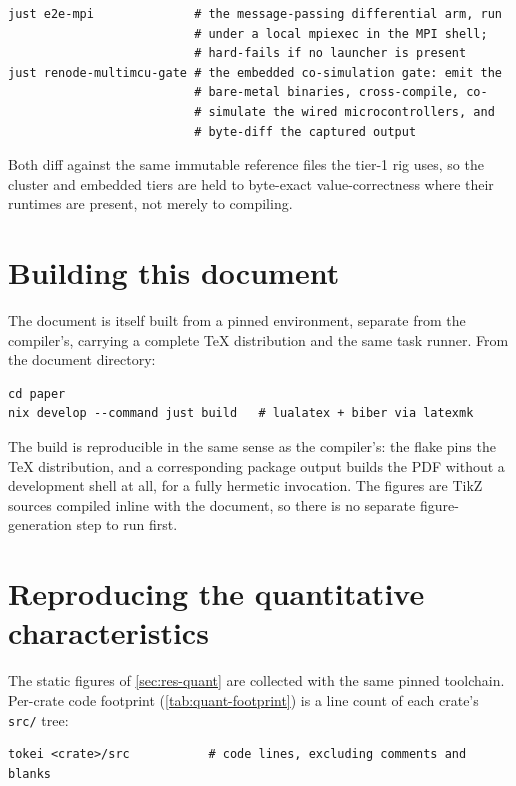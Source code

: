 \begin{verbatim}
just e2e-mpi              # the message-passing differential arm, run
                          # under a local mpiexec in the MPI shell;
                          # hard-fails if no launcher is present
just renode-multimcu-gate # the embedded co-simulation gate: emit the
                          # bare-metal binaries, cross-compile, co-
                          # simulate the wired microcontrollers, and
                          # byte-diff the captured output
\end{verbatim}

Both diff against the same immutable reference files the tier-1 rig uses, so the
cluster and embedded tiers are held to byte-exact value-correctness where their
runtimes are present, not merely to compiling.

\section{Building this document}

The document is itself built from a pinned environment, separate from the
compiler's, carrying a complete \TeX{} distribution and the same task runner. From
the document directory:

\begin{verbatim}
cd paper
nix develop --command just build   # lualatex + biber via latexmk
\end{verbatim}

The build is reproducible in the same sense as the compiler's: the flake pins the
\TeX{} distribution, and a corresponding package output builds the PDF without a
development shell at all, for a fully hermetic invocation. The figures are TikZ
sources compiled inline with the document, so there is no separate figure-generation
step to run first.

\section{Reproducing the quantitative characteristics}\label{sec:repro-quant}

The static figures of \cref{sec:res-quant} are collected with the same pinned
toolchain. Per-crate code footprint (\cref{tab:quant-footprint}) is a line count of
each crate's \texttt{src/} tree:

\begin{verbatim}
tokei <crate>/src           # code lines, excluding comments and blanks
\end{verbatim}

